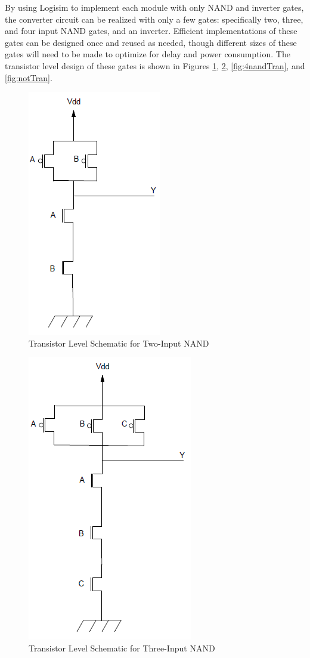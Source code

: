 \documentclass[12pt]{article}
\begin{document}
By using Logisim to implement each module with only NAND and inverter gates, the converter circuit can be realized with only a few gates: specifically two, three, and four input NAND gates, and an inverter.
Efficient implementations of these gates can be designed once and reused as needed, though different sizes of these gates will need to be made to optimize for delay and power consumption. 
The transistor level design of these gates is shown in Figures \ref{fig:2nandTran}, \ref{fig:3nandTran}, \ref{fig:4nandTran}, and \ref{fig:notTran}.
\begin{figure}[H]
	\centering
	\includegraphics[width=0.3\linewidth, keepaspectratio]{NAND_2_Trans.png}
	\caption{Transistor Level Schematic for Two-Input NAND}
	\label{fig:2nandTran}
\end{figure}

\begin{figure}[H]
	\centering
	\includegraphics[width=0.3\linewidth, keepaspectratio]{NAND_3_Trans.png}
	\caption{Transistor Level Schematic for Three-Input NAND}
	\label{fig:3nandTran}
\end{figure}
\end{document}
